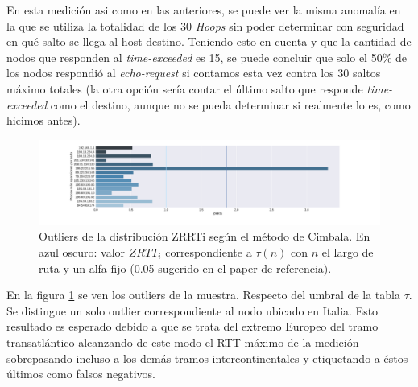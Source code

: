 En esta medición asi como en las anteriores, se puede ver la misma anomalía en la que se utiliza la totalidad de los 30 \emph{Hoops} sin poder determinar con seguridad en qué salto se llega al host destino. Teniendo esto en cuenta y que la cantidad de nodos que responden al \emph{time-exceeded} es 15, se puede concluir que solo el 50\% de los nodos respondió al \emph{echo-request} si contamos esta vez contra los 30 saltos máximo totales (la otra opción sería contar el último salto que responde \emph{time-exceeded} como el destino, aunque no se pueda determinar si realmente lo es, como hicimos antes).


\begin{figure}[H]
   \centering
       \includegraphics[width=1\textwidth, height=1\textheight, keepaspectratio]{../img/nuu-uz-zrtt}
 \caption{Outliers de la distribución ZRRTi según el método de Cimbala. En azul oscuro: valor $ZRTT_i$ correspondiente a $\tau(n)$ con $n$ el largo de ruta y un alfa fijo (0.05 sugerido en el paper de referencia).}
 \label{fig:nuu-uz-zrtt}
\end{figure}

En la figura \ref{fig:nuu-uz-zrtt} se ven los outliers de la muestra. Respecto del umbral de la tabla $\tau$. Se distingue un solo outlier correspondiente al nodo ubicado en Italia. Esto resultado es esperado debido a que se trata del extremo Europeo del tramo transatlántico alcanzando de este modo el RTT máximo de la medición sobrepasando incluso a los demás tramos intercontinentales y etiquetando a éstos últimos como falsos negativos.
